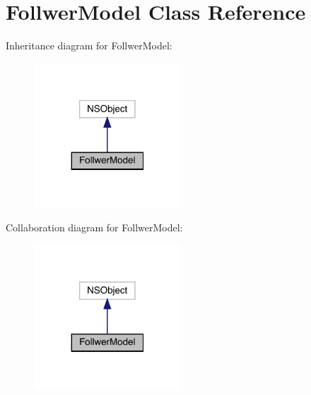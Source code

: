 \hypertarget{interface_follwer_model}{}\section{Follwer\+Model Class Reference}
\label{interface_follwer_model}


Inheritance diagram for Follwer\+Model\+:\nopagebreak
\begin{figure}[H]
\begin{center}
\leavevmode
\includegraphics[width=155pt]{interface_follwer_model__inherit__graph}
\end{center}
\end{figure}


Collaboration diagram for Follwer\+Model\+:\nopagebreak
\begin{figure}[H]
\begin{center}
\leavevmode
\includegraphics[width=155pt]{interface_follwer_model__coll__graph}
\end{center}
\end{figure}
